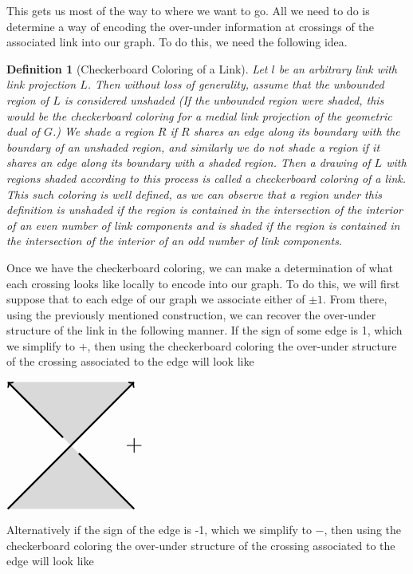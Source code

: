 \documentclass[12pt]{article}
\newtheorem{definition}[theorem]{Definition}
\begin{document}
\par This gets us most of the way to where we want to go. All we need to do is determine a way of encoding the over-under information at crossings of the associated link into our graph. To do this, we need the following idea. 
\begin{definition}[Checkerboard Coloring of a Link]
	Let $l$ be an arbitrary link with link projection $L$. Then without loss of generality, assume that the unbounded region of $L$ is considered unshaded
(If the unbounded region were shaded, this would be the checkerboard coloring for a medial link projection of the geometric dual of $G$.) We shade a region $R$ if $R$ shares an edge along its boundary with the boundary of an unshaded region, and similarly we do not shade a region if it shares an edge along its boundary with a shaded region. Then a drawing of $L$ with regions shaded according to this process is called a \textit{checkerboard} coloring of a link. This such coloring is well defined, as we can observe that a region under this definition is unshaded if the region is contained in the intersection of the interior of an even number of link components and is shaded if the region is contained in the intersection of the interior of an odd number of link components.
\end{definition} 
Once we have the checkerboard coloring, we can make a determination of what each crossing looks like locally to encode into our graph. To do this, we will first suppose that to each edge of our graph we associate either of $\pm 1$. From there, using the previously mentioned construction, we can recover the over-under structure of the link in the following manner. If the sign of some edge is 1, which we simplify to $+$, then using the checkerboard coloring the over-under structure of the crossing associated to the edge will look like 
\begin{center}
$	\begin{tikzpicture}
		\fill[gray!30] (0,0) --(2,2) -- (4,0);
		\fill[gray!30] (4,4) --(2,2) -- (0,4);
		\draw[->,ultra thick] (0,0) -- (4,4);
		\draw[<-, ultra thick] (0,4) -- (1.75,2.25);
		\draw[-, ultra thick] (2.25,1.75) -- (4,0);
		\node (+) at (4,2){\scalebox{2}{+}};	
	\end{tikzpicture}$
	\end{center}
Alternatively if the sign of the edge is -1, which we simplify to $-$, then using the checkerboard coloring the over-under structure of the crossing associated to the edge will look like 
	
\end{document}
